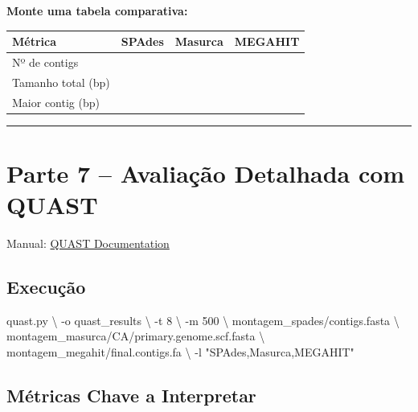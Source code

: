 \documentclass[
  brazilian,
  letterpaper,
  DIV=11,
  numbers=noendperiod]{scrartcl}
\newenvironment{Shaded}{\begin{snugshade}}{\end{snugshade}}
\newcommand{\AttributeTok}[1]{\textcolor[rgb]{0.40,0.45,0.13}{#1}}
\newcommand{\DataTypeTok}[1]{\textcolor[rgb]{0.68,0.00,0.00}{#1}}
\newcommand{\ExtensionTok}[1]{\textcolor[rgb]{0.00,0.23,0.31}{#1}}
\newcommand{\NormalTok}[1]{\textcolor[rgb]{0.00,0.23,0.31}{#1}}
\newcommand{\StringTok}[1]{\textcolor[rgb]{0.13,0.47,0.30}{#1}}
\newcounter{none} %
\begin{document}
\textbf{Monte uma tabela comparativa:}

{\def\LTcaptype{none} %
\begin{longtable}[]{@{}llll@{}}
\toprule\noalign{}
Métrica & SPAdes & Masurca & MEGAHIT \\
\midrule\noalign{}
\endhead
\bottomrule\noalign{}
\endlastfoot
Nº de contigs & & & \\
Tamanho total (bp) & & & \\
Maior contig (bp) & & & \\
\end{longtable}
}

\begin{center}\rule{0.5\linewidth}{0.5pt}\end{center}

\section{Parte 7 -- Avaliação Detalhada com
QUAST}\label{parte-7-avaliauxe7uxe3o-detalhada-com-quast}

Manual: \href{http://quast.sourceforge.net/docs/manual.html}{QUAST
Documentation}

\subsection{Execução}\label{execuuxe7uxe3o-4}

\begin{Shaded}
\begin{Highlighting}[]
\ExtensionTok{quast.py} \DataTypeTok{\textbackslash{}}
    \AttributeTok{{-}o}\NormalTok{ quast\_results }\DataTypeTok{\textbackslash{}}
    \AttributeTok{{-}t}\NormalTok{ 8 }\DataTypeTok{\textbackslash{}}
    \AttributeTok{{-}m}\NormalTok{ 500 }\DataTypeTok{\textbackslash{}}
\NormalTok{    montagem\_spades/contigs.fasta }\DataTypeTok{\textbackslash{}}
\NormalTok{    montagem\_masurca/CA/primary.genome.scf.fasta }\DataTypeTok{\textbackslash{}}
\NormalTok{    montagem\_megahit/final.contigs.fa }\DataTypeTok{\textbackslash{}}
    \AttributeTok{{-}l} \StringTok{"SPAdes,Masurca,MEGAHIT"}
\end{Highlighting}
\end{Shaded}

\subsection{Métricas Chave a
Interpretar}\label{muxe9tricas-chave-a-interpretar}
\end{document}
